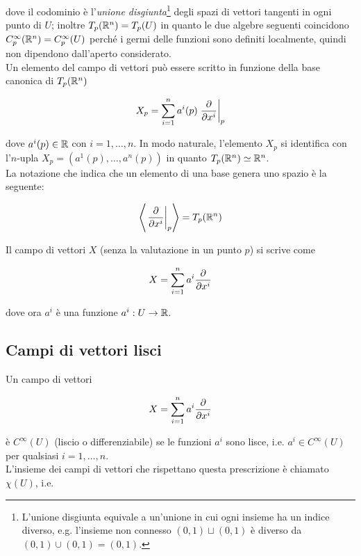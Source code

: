 dove il codominio è l'\textit{unione disgiunta}\footnote{%
	L'unione disgiunta equivale a un'unione in cui ogni insieme ha un indice diverso, e.g. l'insieme non connesso $ (0,1) \sqcup (0,1) $ è diverso da $ (0,1) \cup (0,1) = (0,1) $.%
} degli spazi di vettori tangenti in ogni punto di $ U $; inoltre $ T_{p}(\mathbb{R}^{n}) = T_{p}(U) $ in quanto le due algebre seguenti coincidono $ C_{p}^{\infty}(\mathbb{R}^{n}) = C_{p}^{\infty}(U) $ perché i germi delle funzioni sono definiti localmente, quindi non dipendono dall'aperto considerato. \\
Un elemento del campo di vettori può essere scritto in funzione della base canonica di $ T_{p}(\mathbb{R}^{n}) $

\begin{equation}
	X_{p} = \sum_{i=1}^{n} a^{i}(p) \eval{ \pdv{x^{i}} }_{p}
\end{equation}

dove $ a^{i}(p) \in \mathbb{R} $ con $ i=1,\dots,n $. In modo naturale, l'elemento $ X_{p} $ si identifica con l'$ n $-upla $ X_{p} = (a^{1}(p),\dots,a^{n}(p)) $ in quanto $ T_{p}(\mathbb{R}^{n}) \simeq \mathbb{R}^{n} $. \\
La notazione che indica che un elemento di una base genera uno spazio è la seguente:

\begin{equation}
	\ev{ \eval{ \pdv{x^{i}} }_{p} } = T_{p}(\R^{n})
\end{equation}

Il campo di vettori $ X $ (senza la valutazione in un punto $ p $) si scrive come

\begin{equation}
	X = \sum_{i=1}^{n} a^{i} \pdv{x^{i}}
\end{equation}

dove ora $ a^{i} $ è una funzione $ a^{i} : U \to \mathbb{R} $.

\subsection{Campi di vettori lisci}

Un campo di vettori

\begin{equation}
	X = \sum_{i=1}^{n} a^{i} \pdv{x^{i}}
\end{equation}

è $ C^{\infty} (U) $ (liscio o differenziabile) se le funzioni $ a^{i} $ sono lisce, i.e. $ a^{i} \in C^{\infty}(U) $ per qualsiasi $ i=1,\dots,n $. \\
L'insieme dei campi di vettori che rispettano questa prescrizione è chiamato $ \chi(U) $, i.e.


